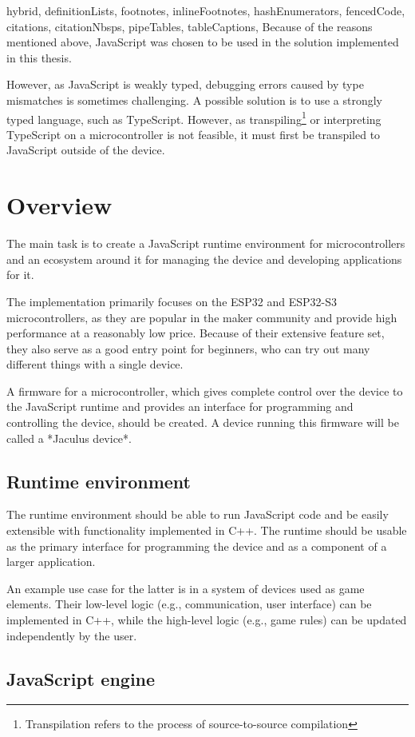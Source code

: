 \begin{markdown*}{%
  hybrid,
  definitionLists,
  footnotes,
  inlineFootnotes,
  hashEnumerators,
  fencedCode,
  citations,
  citationNbsps,
  pipeTables,
  tableCaptions,
}
Because of the reasons mentioned above, JavaScript was chosen to be used in the solution implemented in this thesis.

However, as JavaScript is weakly typed, debugging errors caused by type mismatches is sometimes challenging. A possible solution is to use a strongly typed language, such as TypeScript. However, as transpiling\footnote{Transpilation refers to the process of source-to-source compilation} or interpreting TypeScript on a microcontroller is not feasible, it must first be transpiled to JavaScript outside of the device.


\chapter{Overview}

The main task is to create a JavaScript runtime environment for microcontrollers and an ecosystem around it for managing the device and developing applications for it.

The implementation primarily focuses on the ESP32 and ESP32-S3 microcontrollers, as they are popular in the maker community and provide high performance at a reasonably low price. Because of their extensive feature set, they also serve as a good entry point for beginners, who can try out many different things with a single device.

A firmware for a microcontroller, which gives complete control over the device to the JavaScript runtime and provides an interface for programming and controlling the device, should be created. A device running this firmware will be called a *Jaculus device*.

\section{Runtime environment}

The runtime environment should be able to run JavaScript code and be easily extensible with functionality implemented in C++. The runtime should be usable as the primary interface for programming the device and as a component of a larger application.

An example use case for the latter is in a system of devices used as game elements. Their low-level logic (e.g., communication, user interface) can be implemented in C++, while the high-level logic (e.g., game rules) can be updated independently by the user.

\section{JavaScript engine}


\end{markdown*}
